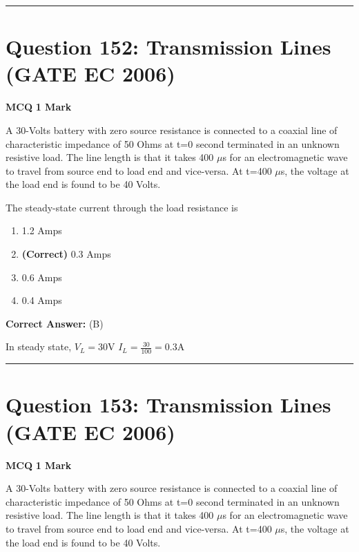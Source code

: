 \documentclass[11pt,a4paper]{article}
\begin{document}
\vspace{1.5em}
\hrule
\vspace{1.5em}

\section*{Question 152: Transmission Lines (GATE EC 2006)}
\noindent \textbf{\color{primary}MCQ} \hfill \textbf{\color{secondary}1 Mark}


\noindent A 30-Volts battery with zero source resistance is connected to a coaxial line of
characteristic impedance of 50 Ohms at t=0 second terminated in an unknown resistive load. The line length is that it takes 400 $\mu$s for an electromagnetic wave to travel from source end to load end and vice-versa. At  t=400 $\mu$s,  the voltage at the load end is
found to be 40 Volts. 

 The steady-state current through the load resistance is


\begin{enumerate}[label=(\Alph*)]
    \item 1.2 Amps
    \item \textbf{(Correct)} 0.3 Amps
    \item 0.6 Amps
    \item 0.4 Amps
\end{enumerate}

\noindent \textbf{Correct Answer:} (B)

\begin{tcolorbox}[solbox, title=Detailed Solution -- Question 152]
In steady state, $V_{L}=30 \mathrm{V}$
$I_{L}=\frac{30}{100}=0.3 \mathrm{A}$
\end{tcolorbox}

\vspace{1.5em}
\hrule
\vspace{1.5em}

\section*{Question 153: Transmission Lines (GATE EC 2006)}
\noindent \textbf{\color{primary}MCQ} \hfill \textbf{\color{secondary}1 Mark}


\noindent A 30-Volts battery with zero source resistance is connected to a coaxial line of
characteristic impedance of 50 Ohms at t=0 second terminated in an unknown resistive load. The line length is that it takes 400 $\mu$s for an electromagnetic wave to travel from source end to load end and vice-versa. At  t=400 $\mu$s,  the voltage at the load end is
found to be 40 Volts. 
\end{document}

